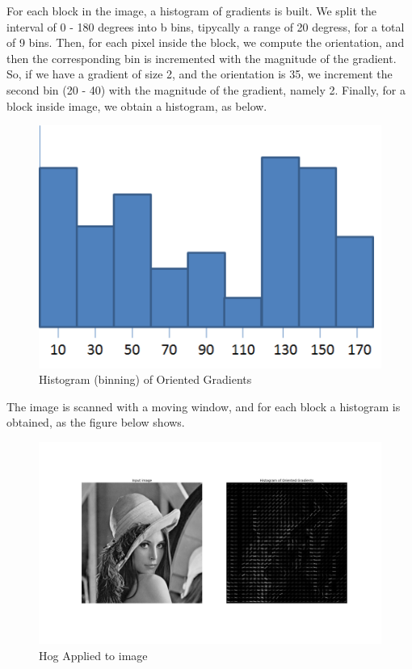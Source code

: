 For each block in the image, a histogram of gradients is built. We split the interval of 0 - 180 degrees into b bins, tipycally a range of 20 degress, for a total of 9 bins.
Then, for each pixel inside the block, we compute the orientation, and then the corresponding bin is incremented with the magnitude of the gradient. So, if we have a gradient of size 2, and the orientation is 35, we increment the second bin (20 - 40) with the magnitude of the gradient, namely 2. Finally, for a block inside image, we obtain a histogram, as below.

\begin{figure}[htb]
	\begin{center}
		\includegraphics[scale=0.7]{img/histogram.png}
	    \caption{Histogram (binning) of Oriented Gradients \label{img:histogram}}
    \end{center}
\end{figure}

The image is scanned with a moving window, and for each block a histogram is obtained, as the figure below shows.

\begin{figure}[htb]
	\begin{center}
		\includegraphics[scale=0.3]{img/hog-lena.png}
	    \caption{Hog Applied to image \label{img:hog-lena}}
    \end{center}
\end{figure}

